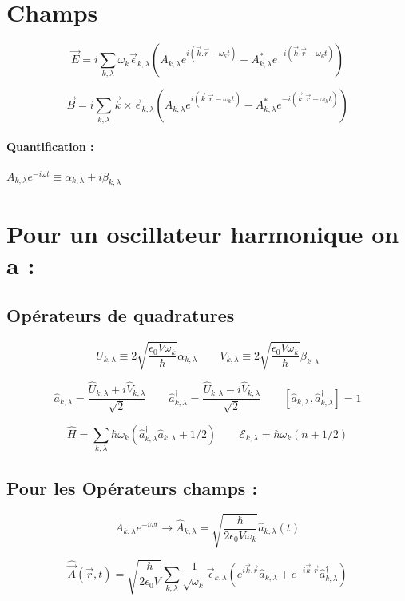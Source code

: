 \documentclass{article}
\begin{document}
\section{Champs}

$$\vec{E} = i\sum_{k,\lambda} \omega_k \vec{\epsilon}_{k,\lambda}\left(A_{k,\lambda} e^{i(\vec{k}.\vec{r}-\omega_k t)}-A^*_{k,\lambda}e^{-i(\vec{k}.\vec{r}-\omega_k t)}\right)$$

$$\vec{B} = i\sum_{k,\lambda} \vec{k} \times \vec{\epsilon}_{k,\lambda}\left(A_{k,\lambda}e^{i(\vec{k}.\vec{r}-\omega_k t)}-A^*_{k,\lambda}e^{-i(\vec{k}.\vec{r}-\omega_k t)}\right)$$

\paragraph{Quantification : } $A_{k,\lambda}e^{-i\omega t} \equiv \alpha_{k,\lambda} + i\beta_{k,\lambda} $

\section{Pour un oscillateur harmonique on a :}

\subsection{Opérateurs de quadratures}

$$ U_{k,\lambda} \equiv 2\sqrt{\frac{\epsilon_0 V \omega_k}{\hbar}}\alpha_{k,\lambda} \qquad V_{k,\lambda} \equiv 2\sqrt{\frac{\epsilon_0 V \omega_k}{\hbar}}\beta_{k,\lambda}$$

$$\hat{a}_{k,\lambda} = \frac{\hat{U}_{k,\lambda}+i\hat{V}_{k,\lambda}}{\sqrt{2}}\qquad \hat{a}_{k,\lambda}^{\dagger} = \frac{\hat{U}_{k,\lambda}-i\hat{V}_{k,\lambda}}{\sqrt{2}}\qquad [\hat{a}_{k,\lambda},\hat{a}_{k,\lambda}^{\dagger}] =1$$

$$\hat{H}=\sum_{k,\lambda}\hbar\omega_k(\hat{a}_{k,\lambda}^{\dagger}\hat{a}_{k,\lambda} +1/2)\qquad \mathcal{E}_{k,\lambda} =\hbar\omega_k (n+1/2)$$

\subsection{Pour les Opérateurs champs :}

$$A_{k,\lambda}e^{-i\omega t}\rightarrow \hat{A}_{k,\lambda}= \sqrt{\frac{\hbar}{2\epsilon_0V\omega_k}}\hat{a}_{k,\lambda}(t) $$

$$\hat{\vec{A}}(\vec{r},t)=\sqrt{\frac{\hbar}{2\epsilon_0V}}\sum_{k,\lambda}\frac{1}{\sqrt{\omega_k}}\vec{\epsilon}_{k,\lambda}\left(e^{i\vec{k}.\vec{r}}\hat{a}_{k,\lambda}+e^{-i\vec{k}.\vec{r}}\hat{a}^{\dagger}_{k,\lambda}\right)$$
\end{document}
